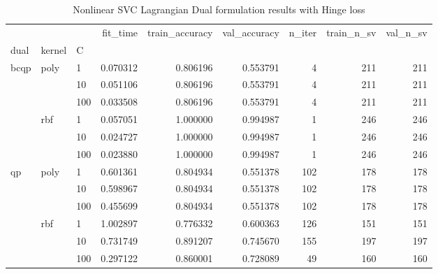 \begin{table}[h!]
\centering
\caption{Nonlinear SVC Lagrangian Dual formulation results with Hinge loss}
\label{nonlinear_lagrangian_dual_svc_cv_results}
\begin{tabular}{lllrrrrrr}
\toprule
   &     &     &  fit\_time &  train\_accuracy &  val\_accuracy &  n\_iter &  train\_n\_sv &  val\_n\_sv \\
dual & kernel & C &           &                 &               &         &             &           \\
\midrule
bcqp & poly & 1   &  0.070312 &        0.806196 &      0.553791 &       4 &         211 &       211 \\
   &     & 10  &  0.051106 &        0.806196 &      0.553791 &       4 &         211 &       211 \\
   &     & 100 &  0.033508 &        0.806196 &      0.553791 &       4 &         211 &       211 \\
   & rbf & 1   &  0.057051 &        1.000000 &      0.994987 &       1 &         246 &       246 \\
   &     & 10  &  0.024727 &        1.000000 &      0.994987 &       1 &         246 &       246 \\
   &     & 100 &  0.023880 &        1.000000 &      0.994987 &       1 &         246 &       246 \\
qp & poly & 1   &  0.601361 &        0.804934 &      0.551378 &     102 &         178 &       178 \\
   &     & 10  &  0.598967 &        0.804934 &      0.551378 &     102 &         178 &       178 \\
   &     & 100 &  0.455699 &        0.804934 &      0.551378 &     102 &         178 &       178 \\
   & rbf & 1   &  1.002897 &        0.776332 &      0.600363 &     126 &         151 &       151 \\
   &     & 10  &  0.731749 &        0.891207 &      0.745670 &     155 &         197 &       197 \\
   &     & 100 &  0.297122 &        0.860001 &      0.728089 &      49 &         160 &       160 \\
\bottomrule
\end{tabular}
\end{table}
